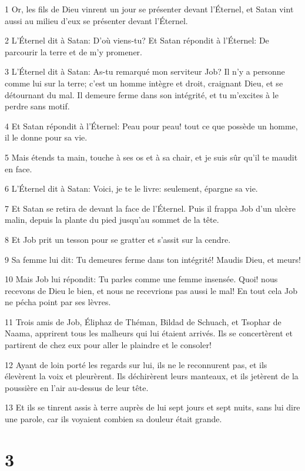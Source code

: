 \par 1 Or, les fils de Dieu vinrent un jour se présenter devant l'Éternel, et Satan vint aussi au milieu d'eux se présenter devant l'Éternel.
\par 2 L'Éternel dit à Satan: D'où viens-tu? Et Satan répondit à l'Éternel: De parcourir la terre et de m'y promener.
\par 3 L'Éternel dit à Satan: As-tu remarqué mon serviteur Job? Il n'y a personne comme lui sur la terre; c'est un homme intègre et droit, craignant Dieu, et se détournant du mal. Il demeure ferme dans son intégrité, et tu m'excites à le perdre sans motif.
\par 4 Et Satan répondit à l'Éternel: Peau pour peau! tout ce que possède un homme, il le donne pour sa vie.
\par 5 Mais étends ta main, touche à ses os et à sa chair, et je suis sûr qu'il te maudit en face.
\par 6 L'Éternel dit à Satan: Voici, je te le livre: seulement, épargne sa vie.
\par 7 Et Satan se retira de devant la face de l'Éternel. Puis il frappa Job d'un ulcère malin, depuis la plante du pied jusqu'au sommet de la tête.
\par 8 Et Job prit un tesson pour se gratter et s'assit sur la cendre.
\par 9 Sa femme lui dit: Tu demeures ferme dans ton intégrité! Maudis Dieu, et meurs!
\par 10 Mais Job lui répondit: Tu parles comme une femme insensée. Quoi! nous recevons de Dieu le bien, et nous ne recevrions pas aussi le mal! En tout cela Job ne pécha point par ses lèvres.
\par 11 Trois amis de Job, Éliphaz de Théman, Bildad de Schuach, et Tsophar de Naama, apprirent tous les malheurs qui lui étaient arrivés. Ils se concertèrent et partirent de chez eux pour aller le plaindre et le consoler!
\par 12 Ayant de loin porté les regards sur lui, ils ne le reconnurent pas, et ils élevèrent la voix et pleurèrent. Ils déchirèrent leurs manteaux, et ils jetèrent de la poussière en l'air au-dessus de leur tête.
\par 13 Et ils se tinrent assis à terre auprès de lui sept jours et sept nuits, sans lui dire une parole, car ils voyaient combien sa douleur était grande.

\chapter{3}

